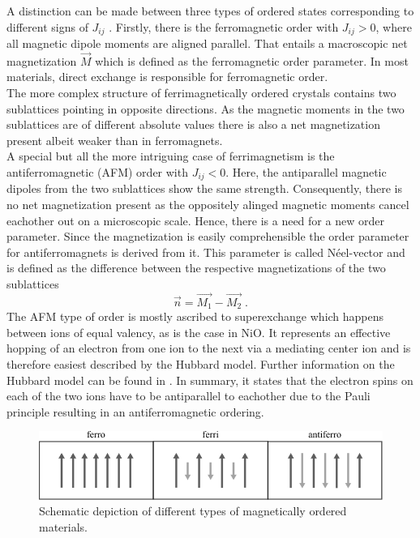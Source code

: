 A distinction can be made between three types of ordered states corresponding to different signs of $J_{ij}$ .
Firstly, there is the ferromagnetic order with $J_{ij}>0$, where all magnetic dipole moments are aligned parallel.
That entails a macroscopic net magnetization $\vec{M}$ which is defined as the ferromagnetic order parameter.
In most materials, direct exchange is responsible for ferromagnetic order. \\
The more complex structure of ferrimagnetically ordered crystals contains two sublattices pointing in opposite directions.
As the magnetic moments in the two sublattices are of different absolute values there is also a net magnetization present albeit weaker than in ferromagnets. \\
A special but all the more intriguing case of ferrimagnetism is the antiferromagnetic (AFM) order with $J_{ij}<0$.
Here, the antiparallel magnetic dipoles from the two sublattices show the same strength.
Consequently, there is no net magnetization present as the oppositely alinged magnetic moments cancel eachother out on a microscopic scale.
Hence, there is a need for a new order parameter.
Since the magnetization is easily comprehensible
the order parameter for antiferromagnets is derived from it.
This parameter is called Néel-vector and is defined as the difference between the respective magnetizations of the two sublattices 
\begin{equation}
    \vec{n} = \vec{M_1} - \vec{M_2} \;.
\end{equation}
The AFM type of order is mostly ascribed to superexchange which happens between ions of equal valency, as is the case in NiO.
It represents an effective hopping of an electron from one ion to the next via a mediating center ion and is therefore easiest described by the Hubbard model.
Further information on the Hubbard model can be found in .
In summary, it states that the electron spins on each of the two ions have to be antiparallel to eachother due to the Pauli principle resulting in an antiferromagnetic ordering.
\begin{figure}[ht]
    \centering
    \includegraphics[width=\textwidth]{pictures/magnetic_order.pdf}
    \caption{Schematic depiction of different types of magnetically ordered materials.}
    \label{fig:magnetic_order}
\end{figure}
